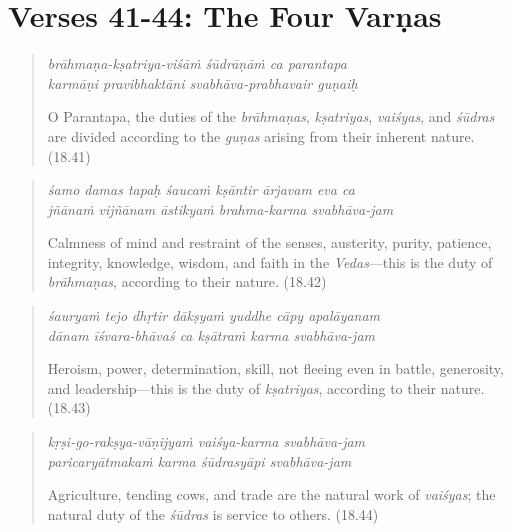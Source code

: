 \documentclass[12pt, twoside, openright]{memoir}
\begin{document}
\section{Verses 41-44: The Four Varṇas}\label{sec-verses-41-44-the-four-varnas}


\par
\begin{verse}
\textit{brāhmaṇa-kṣatriya-viśāṁ śūdrāṇāṁ ca parantapa} \\
\textit{karmāṇi pravibhaktāni svabhāva-prabhavair guṇaiḥ}

\noindent O Parantapa, the duties of the \textit{brāhmaṇas}, \textit{kṣatriyas}, \textit{vaiśyas}, and \textit{śūdras} are divided according to the \textit{guṇas} arising from their inherent nature. (18.41)
\end{verse}
\par



\par
\begin{verse}
\textit{śamo damas tapaḥ śaucaṁ kṣāntir ārjavam eva ca} \\
\textit{jñānaṁ vijñānam āstikyaṁ brahma-karma svabhāva-jam}

\noindent Calmness of mind and restraint of the senses, austerity, purity, patience, integrity, knowledge, wisdom, and faith in the \textit{Vedas}---this is the duty of \textit{brāhmaṇas}, according to their nature. (18.42)
\end{verse}
\par



\par
\begin{verse}
\textit{śauryaṁ tejo dhṛtir dākṣyaṁ yuddhe cāpy apalāyanam} \\
\textit{dānam īśvara-bhāvaś ca kṣātraṁ karma svabhāva-jam}

\noindent Heroism, power, determination, skill, not fleeing even in battle, generosity, and leadership---this is the duty of \textit{kṣatriyas}, according to their nature. (18.43)
\end{verse}
\par



\par
\begin{verse}
\textit{kṛṣi-go-rakṣya-vāṇijyaṁ vaiśya-karma svabhāva-jam} \\
\textit{paricaryātmakaṁ karma śūdrasyāpi svabhāva-jam}

\noindent Agriculture, tending cows, and trade are the natural work of \textit{vaiśyas}; the natural duty of the \textit{śūdras} is service to others. (18.44)
\end{verse}
\par
\end{document}
